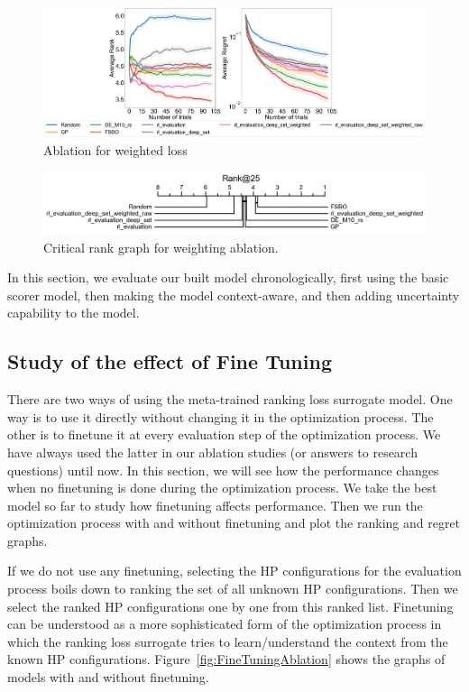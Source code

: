 \documentclass[12pt, twoside, ngerman]{report}
\begin{document}
\begin{figure}[h]
  \centering
    \includegraphics[scale=0.20]{images/RLDeepSetWeighted}
    \caption{Ablation for weighted loss}
    \label{fig:RLDeepSetWeighted}
\end{figure}

\begin{figure}[h]
  \centering
    \includegraphics[scale=0.35]{images/RLDeepSetWeightedRank25}
    \caption{Critical rank graph for weighting ablation.}
    \label{fig:RLDeepSetWeightedRank25}
\end{figure}

In this section, we evaluate our built model chronologically, first using the basic scorer model,  then making the model context-aware, and then adding uncertainty capability to the model.
\fi

\subsection{Study of the effect of Fine Tuning}
\label{sec:EffectOfFineTuningResults}
There are two ways of using the meta-trained ranking loss surrogate model. One way is to use it directly without changing it in the optimization process. The other is to finetune it at every evaluation step of the optimization process. We have always used the latter in our ablation studies (or answers to research questions) until now.
In this section, we will see how the performance changes when no finetuning is done during the optimization process.
We take the best model so far to study how finetuning affects performance. Then we run the optimization process with and without finetuning and plot the ranking and regret graphs.

If we do not use any finetuning, selecting the HP configurations for the evaluation process boils down to ranking the set of all unknown HP configurations. Then we select the ranked HP configurations one by one from this ranked list. Finetuning can be understood as a more sophisticated form of the optimization process in which the ranking loss surrogate tries to learn/understand the context from the known HP configurations. Figure~\ref{fig:FineTuningAblation} shows the graphs of models with and without finetuning.
\end{document}
